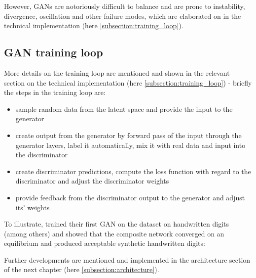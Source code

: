 However, \acp{GAN} are notoriously difficult to balance and are prone to instability, divergence, oscillation and other failure modes, which are elaborated on in the technical implementation (here \ref{subsection:training_loop}).

\pagebreak

\subsection{GAN training loop}

More details on the training loop are mentioned and shown in the relevant section on the technical implementation (here \ref{subsection:training_loop}) - briefly the steps in the training loop are:

\begin{itemize}
	\item sample random data from the latent space and provide the input to the generator
	\item create output from the generator by forward pass of the input through the generator layers, label it automatically, mix it with real data and input into the discriminator
	\item create discriminator predictions, compute the loss function with regard to the discriminator and adjust the discriminator weights
	\item provide feedback from the discriminator output to the generator and adjust its' weights
\end{itemize}

\clearpage

To illustrate, \cite{goodfellow2014generative} trained their first \ac{GAN} on the \cite{mnist} dataset on handwritten digits (among others) and showed that the composite network converged on an equilibrium and produced acceptable synthetic handwritten digits:


Further developments are mentioned and implemented in the architecture section of the next chapter (here \ref{subsection:architecture}).
